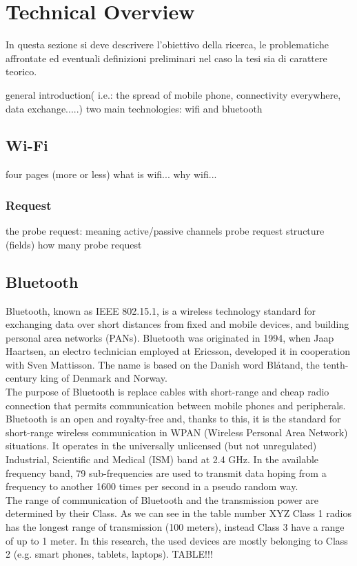 \chapter{Technical Overview}
\label{chapter 3}
\thispagestyle{empty}


\noindent In questa sezione si deve descrivere l'obiettivo della ricerca, le problematiche affrontate ed eventuali definizioni preliminari nel caso la tesi sia di carattere teorico.

general introduction( i.e.: the spread of mobile phone, connectivity everywhere, data exchange.....)
two main technologies: wifi and bluetooth

\section{Wi-Fi}
four pages (more or less)
what is wifi...
why wifi...
\subsection{Request}
the probe request: meaning
active/passive
channels
probe request structure (fields)
how many probe request


\section{Bluetooth}
Bluetooth, known as IEEE 802.15.1, is a wireless technology standard for exchanging data over short distances from fixed and mobile devices, and building personal area networks (PANs).
Bluetooth was originated in 1994, when Jaap Haartsen, an electro technician employed at Ericsson, developed it in cooperation with Sven Mattisson. The name is based on the Danish word Bl\r{a}tand, the tenth-century king of Denmark and Norway. \\
The purpose of Bluetooth is replace cables with short-range and cheap radio connection that permits communication between mobile phones and peripherals.\\
Bluetooth is an open and royalty-free and, thanks to this, it is the standard for short-range wireless communication in WPAN (Wireless Personal Area Network) situations.
It operates in the universally unlicensed (but not unregulated) Industrial, Scientific and Medical (ISM) band at 2.4 GHz.
In the available frequency band, 79 sub-frequencies are used to transmit data hoping from a frequency to another 1600 times per second in a pseudo random way.\\
\linebreak
The range of communication of Bluetooth and the transmission power are determined by their Class. As we can see in the table number XYZ Class 1 radios has the longest range of transmission (100 meters), instead Class 3 have a range of up to 1 meter. 
In this research, the used devices are mostly belonging to Class 2 (e.g. smart phones, tablets, laptops).
TABLE!!!

